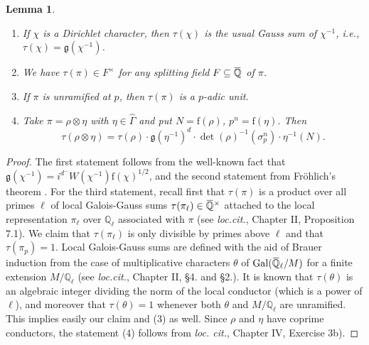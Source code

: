 \documentclass[12pt]{amsart}
\newcommand\bQ{\mathbb{Q}}
\newcommand\g{\mathfrak{g}}
\newcommand{\ob}[1]{\mkern 1.5mu\overline{\mkern-1.5mu#1\mkern-1.5mu}\mkern 1.5mu}
\DeclareMathOperator{\Gal}{Gal}
\newcommand{\ff}{\mathrm{f}}
\theoremstyle{defstyle}
\theoremstyle{thmstyle}
\newtheorem{lemme}[subsubsection]{Lemma}
\begin{document}
\begin{lemme}\label{lem:properties_galois_gauss_sums}\hspace{2em}
	\begin{enumerate}
		\item If $\chi$ is a Dirichlet character, then $\tau(\chi)$ is the usual Gauss sum of $\chi^{-1}$, \textit{i.e.}, $\tau(\chi)=\g(\chi^{-1})$.
		\item We have $\tau(\pi)\in F^\times$ for any splitting field $F\subseteq\ob{\bQ}$ of $\pi$. 
		\item If $\pi$ is unramified at $p$, then $\tau(\pi)$ is a $p$-adic unit. 
		\item Take $\pi=\rho\otimes\eta$ with $\eta\in\widehat{\Gamma}$ and put $N=\ff(\rho)$, $p^n=\ff(\eta)$. Then $$\tau(\rho\otimes\eta)=\tau(\rho)\cdot\g(\eta^{-1})^{d}\cdot\det(\rho)^{-1}(\sigma_p^n)\cdot\eta^{-1}(N).$$
	\end{enumerate}
\end{lemme}
\begin{proof}
	The first statement follows from the well-known fact that $\g(\chi^{-1})=i^{d^-}W(\chi^{-1})\ff(\chi)^{1/2}$, and the second statement from Fröhlich's theorem \cite[Chapter II, Theorem 7.2]{martinet}. For the third statement, recall first that $\tau(\pi)$ is a product over all primes $\ell$ of local Galois-Gauss sums $\tau(\pi_\ell)\in\ob{\bQ}^\times$ attached to the local representation $\pi_\ell$ over $\bQ_\ell$ associated with $\pi$ (see \textit{loc.cit.}, Chapter II, Proposition 7.1). We claim that $\tau(\pi_\ell)$ is only divisible by primes above $\ell$ and that $\tau(\pi_p)=1$. Local Galois-Gauss sums are defined with the aid of Brauer induction from the case of multiplicative characters $\theta$ of $\Gal(\ob{\bQ}_\ell/M)$ for a finite extension $M/\bQ_\ell$ (see \textit{loc.cit.}, Chapter II, §4. and §2.). It is known that $\tau(\theta)$ is an algebraic integer dividing the norm of the local conductor (which is a power of $\ell$), and moreover that $\tau(\theta)=1$ whenever both $\theta$ and $M/\bQ_\ell$ are unramified. This implies easily our claim and (3) as well. Since $\rho$ and $\eta$ have coprime conductors, the statement (4) follows from \textit{loc. cit.}, Chapter IV, Exercise 3b). 
\end{proof}
\end{document}
